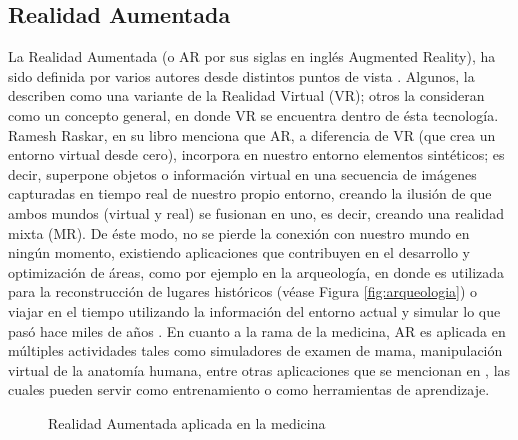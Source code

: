 \documentclass[a4paper,openright,12pt]{report}
\begin{document}
\subsection{Realidad Aumentada}
La Realidad Aumentada (o AR por sus siglas en inglés Augmented Reality), ha sido definida por varios autores desde distintos puntos de vista \citep{milgram1994,azuma1997}. Algunos, la describen como una variante de la Realidad Virtual (VR); otros la consideran como un concepto general, en donde VR se encuentra dentro de ésta tecnología. Ramesh Raskar, en su libro \citep{Bimber2005} menciona que AR, a diferencia de VR (que crea un entorno virtual desde cero), incorpora en nuestro entorno elementos sintéticos; es decir, superpone objetos o información virtual en una secuencia de imágenes capturadas en tiempo real de nuestro propio entorno, creando la ilusión de que ambos mundos (virtual y real) se fusionan en uno, es decir, creando una realidad mixta (MR). De éste modo, no se pierde la conexión con nuestro mundo en ningún momento, existiendo aplicaciones que contribuyen en el desarrollo y optimización de áreas, como por ejemplo en la arqueología, en donde es utilizada para la reconstrucción de lugares históricos (véase Figura \ref{fig:arqueologia}) o viajar en el tiempo utilizando la información del entorno actual y simular lo que pasó hace miles de años \citep{vlahakis2002}. En cuanto a la rama de la medicina, AR es aplicada en múltiples actividades tales como simuladores de examen de mama, manipulación virtual de la anatomía humana, entre otras aplicaciones que se mencionan en \citep{bichlmeier2007}, las cuales pueden servir como entrenamiento o como herramientas de aprendizaje.
\begin{figure}[th]
	\centering
	\caption[Realidad Aumentada aplicada a la medicina]{Realidad Aumentada aplicada en la medicina} \label{fig:medicinaAR}
\end{figure}\\
\end{document}
